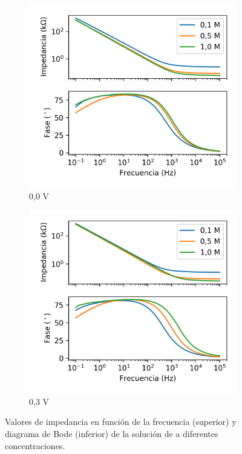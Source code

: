 \documentclass[fleqn,11pt]{SelfArx}
\begin{document}
	\begin{figure}[h]
		\centering
		\begin{subfigure}[t]{0.49\textwidth}
			\centering
			\includegraphics[width = \linewidth]{LiClO4_0,0V}
			\caption{0,0 V}
		\end{subfigure}
		\begin{subfigure}[t]{0.49\textwidth}
			\centering
			\includegraphics[width = \linewidth]{LiClO4_0,3V}
			\caption{0,3 V}
		\end{subfigure}
		\caption{Valores de impedancia en funci\'on de la frecuencia (superior) y diagrama de Bode (inferior) de la soluci\'on de  a diferentes concentraciones.}
		\label{fig: concentraciones}
	\end{figure}
	
\end{document}
